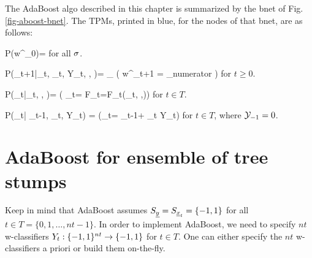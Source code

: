 The AdaBoost algo 
described
in this chapter is summarized
by
the bnet of Fig.\ref{fig-aboost-bnet}.
The TPMs, printed in blue, for the nodes of that
bnet, are as follows:

\beq\color{blue}
P(w^\s_0)=
\;
\eeq
for all $\sigma$.

\beq\color{blue}
P(_{t+1}|_{t},
\alp_t, Y_t,    , )=
\prod_\s
\indi(\;\;\; 
w^\s_{t+1} =
{\sum_\s numerator}
\;\;\;)
\eeq
for $t\geq 0$.


\beq\color{blue}
P(\alp_t|_t, , )=
\indi(\;\;\; \alp_t=
\ln{}
F_t=F_t(_t, ,)\;\;\;) 
\eeq
for $t\in T$.

\beq\color{blue}
P(\caly_t| \caly_{t-1}, \alp_t, Y_t)
=
\indi(\;\;\;\caly_t= \caly_{t-1}+ \alp_t Y_t\;\;\;)
\eeq
for $t\in T$,
where ${\cal Y}_{-1}=0$.

\section{AdaBoost for ensemble of tree stumps}

Keep in mind that
AdaBoost assumes
$S_{\underline{y}}=S_{{\underline{x}}_t}=\{-1, 1\}$
for all $t\in T=\{0,1, \ldots, nt-1\}$.
In order to implement 
AdaBoost, we need to
specify 
$nt$
w-classifiers $Y_t:\{-1, 1\}^{nt}
\rightarrow \{-1, 1\}$ for $t\in T$.
One can either
specify the $nt$ w-classifiers
a priori or build them
on-the-fly.

